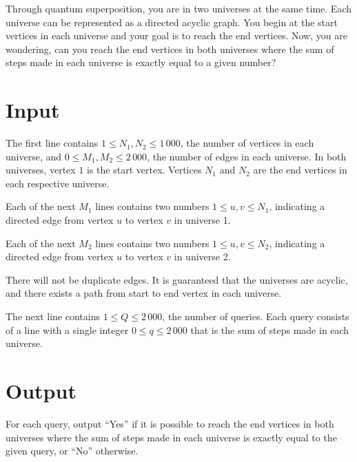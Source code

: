 Through quantum superposition, you are in two universes at the same time. Each universe can be represented as a directed acyclic graph. You begin at the start vertices in each universe and your goal is to reach the end vertices. Now, you are wondering, can you reach the end vertices in both universes where the sum of steps made in each universe is exactly equal to a given number?

\section*{Input}

The first line contains $1 \leq N_1, N_2 \leq 1\,000$, the number of vertices in each universe, and $0 \leq M_1, M_2 \leq 2\,000$, the number of edges in each universe. In both universes, vertex $1$ is the start vertex. Vertices $N_1$ and $N_2$ are the end vertices in each respective universe.

Each of the next $M_1$ lines contains two numbers $1 \leq u, v \leq N_1$, indicating a directed edge from vertex $u$ to vertex $v$ in universe 1.

Each of the next $M_2$ lines contains two numbers $1 \leq u, v \leq N_2$, indicating a directed edge from vertex $u$ to vertex $v$ in universe 2.

There will not be duplicate edges. It is guaranteed that the universes are acyclic, and there exists a path from start to end vertex in each universe.

The next line contains $1 \leq Q \leq 2\,000$, the number of queries. Each query consists of a line with a single integer $0 \leq q \leq 2\,000$ that is the sum of steps made in each universe.

\section*{Output}

For each query, output ``Yes'' if it is possible to reach the end vertices in both universes where the sum of steps made in each universe is exactly equal to the given query, or ``No'' otherwise.
